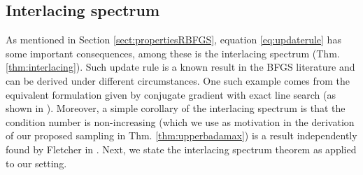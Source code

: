 \documentclass[12pt,conference,compsocconf]{IEEEtran}
\begin{document}
\subsection{Interlacing spectrum}\label{sect:interlacing}
As mentioned in Section \ref{sect:propertiesRBFGS}, equation \ref{eq:updaterule} has some important consequences, among these is the interlacing spectrum (Thm. \ref{thm:interlacing}). Such update rule is a known result in the BFGS literature and can be derived under different circumstances. One such example comes from the equivalent formulation given by conjugate gradient with exact line search (as shown in \cite{Nazareth}). Moreover, a simple corollary of the interlacing spectrum is that the condition number is non-increasing (which we use as motivation in the derivation of our proposed sampling in Thm. \ref{thm:upperbadamax}) is a result independently found by Fletcher in \cite{Fletcher}.
Next, we state the interlacing spectrum theorem as applied to our setting.
\end{document}
